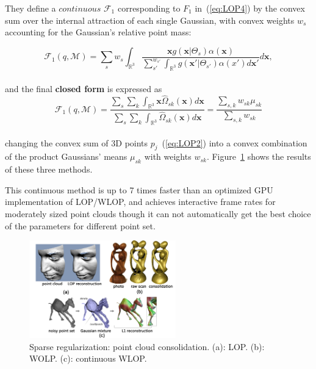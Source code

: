 They define a $continuous$ $\mathcal{F}_1$ corresponding to $F_1$ in~(\ref{eq:LOP4}) by the convex sum over the internal attraction of each single Gaussian, with convex weights $w_s$ accounting for the Gaussian's relative point mass:

\small{
\begin{equation}
 \label{eq:CLOP2}
 \mathcal{F}_1(q,\mathcal{M})=\sum_{s}^{}w_s\int_{\mathbb{R}^3}^{}
 \frac{\mathbf{x}g(\mathbf{x}|\Theta_{s})\alpha(\mathbf{x})}
 {\sum_{s'}^{w_{s'}}\int_{\mathbb{R}^3}^{}g(\mathbf{x'}|\Theta_{s'})\alpha(x')d\mathbf{x}'}
 d\mathbf{x},
\end{equation}
}
\\
and the final \textbf{closed form} is expressed as
\small{
\begin{equation}
 \label{eq:CLOP3}
 \mathcal{F}_1(q,\mathcal{M})=\frac{\sum_{s}^{}\sum_{k}^{}\int_{\mathbb{R}^3}^{}\mathbf{x}\widehat{\Omega}_{sk}(\mathbf{x})d\mathbf{x}}
 {\sum_{s}^{}\sum_{k}^{}\int_{\mathbb{R}^3}^{}\widehat{\Omega}_{sk}(\mathbf{x})d\mathbf{x}}
 =\frac{\sum_{s,k}^{}w_{sk}\mu_{sk}}
 {\sum_{s,k}^{}w_{sk}}
\end{equation}
}
\\
changing the convex sum of 3D points $p_{j}$~(\ref{eq:LOP2}) into a convex combination of the product Gaussians' means $\mu_{sk}$ with weights $w_{sk}$.
Figure~\ref{fig:L1 median consolidation} shows the results of these three methods.

This continuous method is up to 7 times faster than an optimized GPU implementation of LOP/WLOP, and achieves interactive frame rates for moderately sized point clouds though it can not automatically get the best choice of the parameters for different point set.

\begin{figure}[ht]
  \centering
  \includegraphics[width=2.5in]{images/reconstruction_L1}
  \caption{Sparse regularization: point cloud consolidation. (a): LOP\cite{lipman2007parameterization}. (b): WOLP\cite{huang2009consolidation}. (c): continuous WLOP\cite{preiner2014CPF}.}
  \label{fig:L1 median consolidation}
\end{figure}


